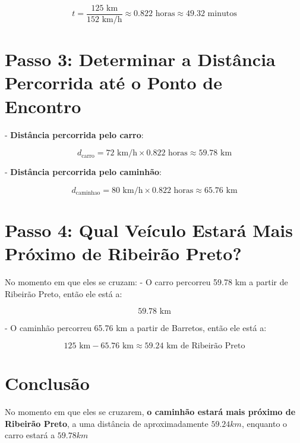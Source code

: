 \documentclass{article}
\begin{document}
\[
t = \frac{125 \text{ km}}{152 \text{ km/h}} \approx 0.822 \text{ horas} \approx 49.32 \text{ minutos}
\]

\section*{Passo 3: Determinar a Distância Percorrida até o Ponto de Encontro}
- \textbf{Distância percorrida pelo carro}:

\[
d_{\text{carro}} = 72 \text{ km/h} \times 0.822 \text{ horas} \approx 59.78 \text{ km}
\]

- \textbf{Distância percorrida pelo caminhão}:

\[
d_{\text{caminhao}} = 80 \text{ km/h} \times 0.822 \text{ horas} \approx 65.76 \text{ km}
\]

\section*{Passo 4: Qual Veículo Estará Mais Próximo de Ribeirão Preto?}
No momento em que eles se cruzam:
- O carro percorreu 59.78 km a partir de Ribeirão Preto, então ele está a:

\[
 59.78 \text{ km} 
\]

- O caminhão percorreu 65.76 km a partir de Barretos, então ele está a:

\[
125 \text{ km} - 65.76 \text{ km} \approx 59.24 \text{ km} \text{ de Ribeirão Preto}
\]

\section*{Conclusão}
No momento em que eles se cruzarem, \textbf{o caminhão estará mais próximo de Ribeirão Preto}, a uma distância de aproximadamente \(59.24 km\), enquanto o carro estará a \(59.78 km\)
\end{document}
